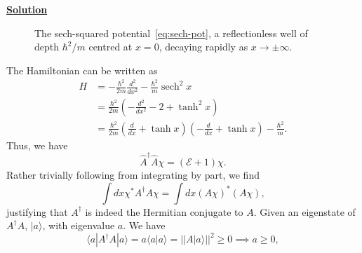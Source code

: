 \noindent \underline{\textbf{Solution}}
\begin{figure}[htbp]
\centering
{}
\caption{The sech-squared potential~\eqref{eq:sech-pot}, a reflectionless
well of depth $\hbar^2/m$ centred at $x=0$, decaying rapidly as
$x\to\pm\infty$.}
\label{fig:sech-pot}
\end{figure}
The Hamiltonian can be written as
\begin{align}
    H &= -\frac{\hbar^2}{2m}\frac{d^2}{dx^2} -\frac{\hbar^2}{m}\operatorname{sech}^2 x\\ &= \frac{\hbar^2}{2m}\left(-\frac{d^2}{dx^2}-2+\tanh^2x\right)\\ &= \frac{\hbar^2}{2m}\left(\frac{d}{dx}+\tanh x\right)\left(-\frac{d}{dx}+\tanh x\right)-\frac{\hbar^2}{m}.
\end{align}
Thus, we have
\begin{equation}
  \hat{A}^\dagger \hat{A}\chi = (\mathcal{E}+1)\chi.
\end{equation}
Rather trivially following from integrating by part, we find
\begin{equation}
    \int dx \chi^*A^\dagger A\chi = \int dx (A\chi)^*(A\chi),
\end{equation}
justifying that $A^\dagger$ is indeed the Hermitian conjugate to $A$. Given an eigenstate of $A^\dagger A$, $|a\rangle$, with eigenvalue $a$. We have
\begin{equation}
    \langle a|A^\dagger A|a\rangle = a\langle a |a\rangle = ||A|a\rangle||^2 \geq 0 \implies a\geq0,
\end{equation}
